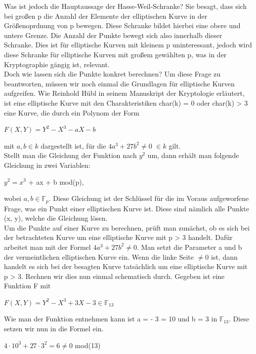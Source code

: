 Was ist jedoch die Hauptaussage der Hasse-Weil-Schranke? Sie besagt, dass sich bei großen p die Anzahl der Elemente der elliptischen Kurve in der Größenoprdnung von p bewegen. Diese Schranke bildet hierbei eine obere und untere Grenze. Die Anzahl der Punkte bewegt sich also innerhalb dieser Schranke. Dies ist für elliptische Kurven mit kleinem p uninteressant, jedoch wird diese Schranke für elliptische Kurven mit großem gewählten p, was in der Kryptographie gängig ist, relevant.\\


Doch wie lassen sich die Punkte konkret berechnen? Um diese Frage zu beantworten, müssen wir noch einmal die Grundlagen für elliptische Kurven aufgreifen. Wie Reinhold Hübl in seinem Manuskript der Kryptologie \cite[vgl.][S. 157]{reinholdhuebl} erläutert, ist eine elliptische Kurve mit den Charakteristiken char(k) = 0 oder char(k) > 3 eine Kurve, die durch ein Polynom der Form
\begin{center}
$F(X, Y) = Y^{2} - X^{3} - aX - b$
\end{center} 

mit $a, b \in k$ dargestellt ist, für die $4a^3 + 27b^2 \neq 0$  $\in k$ gilt.\\

Stellt man die Gleichung der Funktion nach $y^{2}$ um, dann erhält man folgende Gleichung in zwei Variablen:
\begin{center}
$y^{2} =  x^{3}$ + ax + b  mod(p),
\end{center}

wobei $a, b \in \mathbb{F}_p$. Diese Gleichung ist der Schlüssel für die im Voraus aufgeworfene Frage, was ein Punkt einer elliptischen Kurve ist. Diese sind nämlich alle Punkte (x, y), welche die Gleichung lösen.\\

Um die Punkte auf einer Kurve zu berechnen, prüft man zunächst, ob es sich bei der betrachteten Kurve um eine elliptische Kurve mit p > 3 handelt. Dafür arbeitet man mit der Formel  $4a^3 + 27b^2 \neq 0$. Man setzt die Parameter a und b der vermeintlichen elliptischen Kurve ein. Wenn die linke Seite $\neq 0$ ist, dann handelt es sich bei der besagten Kurve tatsächlich um eine elliptische Kurve mit p > 3. Rechnen wir dies nun einmal schematisch durch. Gegeben ist eine Funktion F mit
\begin{center}
$F(X, Y) = Y^{2} - X^{3} + 3X - 3 \in \mathbb{F}_{13}$
\end{center} 

Wie man der Funktion entnehmen kann ist a = - 3 = 10 und b = 3 in $\mathbb{F}_{13}$. Diese setzen wir nun in die Formel ein.
\begin{center}
$4 \cdot 10^3 + 27 \cdot 3^2 = 6 \neq 0$ mod(13)
\end{center} 

